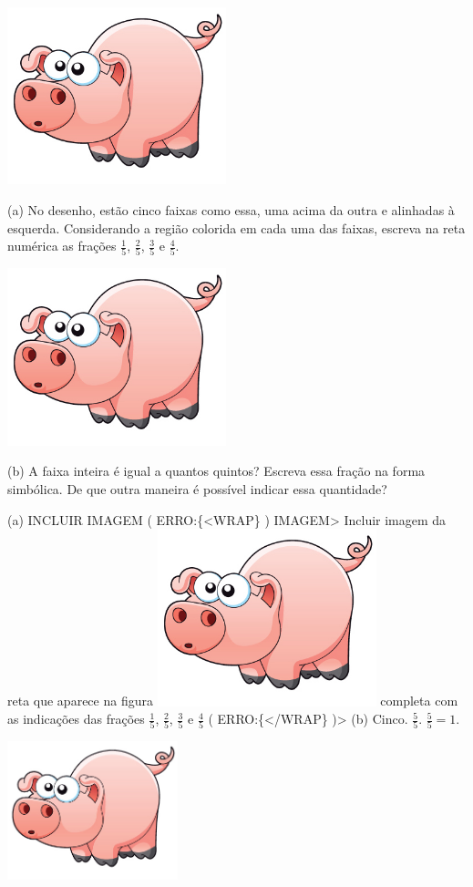 \documentclass[a4,12pt]{book}
\begin{document}
\includegraphics[width=180pt, keepaspectratio]{pig}


(a) No desenho, estão cinco faixas como essa, uma acima da outra e alinhadas à esquerda. Considerando a região colorida em cada uma das faixas, escreva na reta numérica as frações $\frac{1}{5}$, $\frac{2}{5}$, $\frac{3}{5}$ e $\frac{4}{5}$.

\includegraphics[width=180pt, keepaspectratio]{pig}


(b) A faixa inteira é igual a quantos quintos? Escreva essa fração na forma simbólica. De que outra maneira é possível indicar essa quantidade?


(a) INCLUIR IMAGEM
( ERRO:\{<WRAP\} ) IMAGEM>
Incluir imagem da reta que aparece na figura \includegraphics[width=180pt, keepaspectratio]{pig} completa com as indicações das frações $\frac{1}{5}$, $\frac{2}{5}$, $\frac{3}{5}$ e $\frac{4}{5}$
( ERRO:\{</WRAP\} )>
(b) Cinco. $\frac{5}{5}$. $\frac{5}{5}=1$.



\includegraphics[width=\textwidth,height=4cm, keepaspectratio]{pig}
\end{document}
